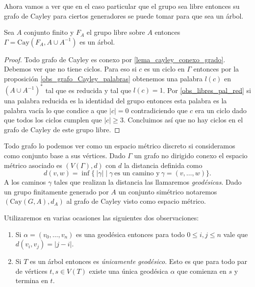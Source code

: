 \documentclass[tesis.tex]{subfiles}
\begin{document}
Ahora vamos a ver que en el caso particular que el grupo sea libre entonces su grafo de Cayley para ciertos generadores se puede tomar para que sea un árbol.

\begin{lema}\label{lema_cayley_libre_arbol}
	Sea $A$ conjunto finito y $F_{A}$ el grupo libre sobre $A$ entonces $\Gamma = \text{Cay}(F_{A},A \cup A^{-1})$ es un árbol.
\end{lema}

\begin{proof}
	Todo grafo de Cayley es conexo por \ref{lema_cayley_conexo_grado}.
	Debemos ver que no tiene ciclos.
	Para eso si $c$ es un ciclo en $\Gamma$ entonces por la proposición \ref{obs_grafo_Cayley_palabras} obtenemos una palabra $l(c)$ en $(A \cup A^{-1})^*$ tal que es {reducida} y tal que $l(c) = 1$.
	Por \ref{obs_libres_pal_red} si una palabra reducida es la identidad del grupo entonces esta palabra es la palabra vacía lo que condice a que $|c|=0$ contradiciendo que $c$ era un ciclo dado que todos los ciclos cumplen que $|c| \ge 3$.
	Concluimos así que no hay ciclos en el grafo de Cayley de este grupo libre.
	
\end{proof}


Todo grafo lo podemos ver como un espacio métrico discreto si consideramos como conjunto base a sus vértices. 
Dado $\Gamma$ un grafo no dirigido conexo el espacio métrico asociado es 
$ (V(\Gamma), d )$ con $d$ la distancia definida como 
\[
	d(v,w) = \inf \{ \  |\gamma|  \mid  \gamma \ \text{es un camino y} \ 
	\gamma=(v,\dots, w)  \}.
\] 
A los caminos $\gamma$ tales que realizan la distancia las llamaremos \emph{geodésicas}.
Dado un grupo finitamente generado por $A$ un conjunto simétrico notaremos $(\text{Cay}(G,A), d_{A})$ al grafo de Cayley visto como espacio métrico.

Utilizaremos en varias ocasiones las siguientes dos observaciones:

\begin{enumerate}[1-]
	\item Si $\alpha = (v_{0}, \dots, v_{n})$ es una geodésica entonces para todo $0 \le i,j \le n$ vale que  $d(v_{i}, v_{j}) = |j-i|$.
	\item Si $T$ es un árbol entonces es \emph{únicamente geodésico}.
	Esto es que para todo par de vértices $t,s \in V(T)$ existe una única geodésica $\alpha$ que comienza en $s$ y termina en $t$.
\end{enumerate}
\end{document}
